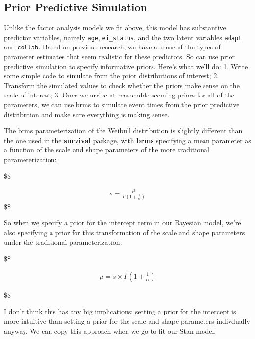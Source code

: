 \documentclass[
  letterpaper,
  DIV=11,
  numbers=noendperiod]{scrreprt}
\begin{document}
\hypertarget{prior-predictive-simulation}{%
\subsection{Prior Predictive
Simulation}\label{prior-predictive-simulation}}

Unlike the factor analysis models we fit above, this model has
substantive predictor variables, namely \texttt{age},
\texttt{ei\_status}, and the two latent variables \texttt{adapt} and
\texttt{collab}. Based on previous research, we have a sense of the
types of parameter estimates that seem realistic for these predictors.
So can use prior predictive simulation to specify informative priors.
Here's what we'll do: 1. Write some simple code to simulate from the
prior distributions of interest; 2. Transform the simulated values to
check whether the priors make sense on the scale of interest; 3. Once we
arrive at reasonable-seeming priors for all of the parameters, we can
use brms to simulate event times from the prior predictive distribution
and make sure everything is making sense.

The brms parameterization of the Weibull distribution
\href{https://cran.r-project.org/web/packages/brms/vignettes/brms_families.html}{is
slightly different} than the one used in the \textbf{survival} package,
with \textbf{brms} specifying a mean parameter as a function of the
scale and shape parameters of the more traditional parameterization:

\$\$

\begin{align*}
s = \frac{\mu}{\Gamma\left(1 + \frac{1}{\alpha}\right)}
\end{align*} \$\$

So when we specify a prior for the intercept term in our Bayesian model,
we're also specifying a prior for this transformation of the scale and
shape parameters under the traditional parameterization:

\$\$

\begin{align*}
\mu = s \times \Gamma\left(1 + \frac{1}{\alpha}\right)
\end{align*}

\$\$

I don't think this has any big implications: setting a prior for the
intercept is more intuitive than setting a prior for the scale and shape
parameters indivdually anyway. We can copy this approach when we go to
fit our Stan model.
\end{document}
